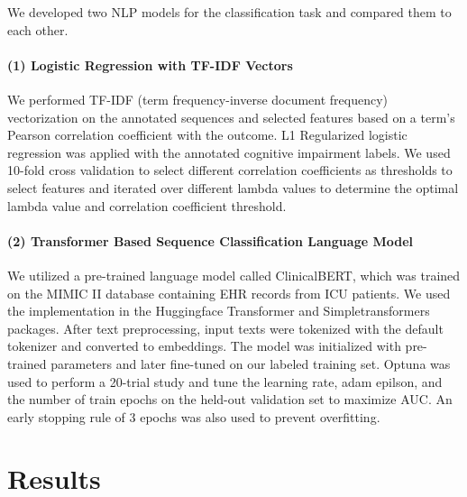 \documentclass[pmlr,twocolumn,10pt]{jmlr} %
\begin{document}
We developed two NLP models for the classification task and compared them to each other.

\label{sec:TFIDF}  
\paragraph{(1) Logistic Regression with TF-IDF Vectors} We performed TF-IDF (term frequency-inverse document frequency) vectorization on the annotated sequences and selected features based on a term's Pearson correlation coefficient with the outcome. L1 Regularized logistic regression was applied with the annotated cognitive impairment labels. We used 10-fold cross validation to select different correlation coefficients as thresholds to select features and iterated over different lambda values to determine the optimal lambda value and correlation coefficient threshold. 


\label{sec:Transformer}  
\paragraph{(2) Transformer Based Sequence Classification Language Model} We utilized a pre-trained language model called ClinicalBERT, which was trained on the MIMIC II database containing EHR records from ICU patients. We used the implementation in the Huggingface Transformer and Simpletransformers packages. After text preprocessing, input texts were tokenized with the default tokenizer and converted to embeddings. The model was initialized with pre-trained parameters and later fine-tuned on our labeled training set. Optuna was used to perform a 20-trial study and tune the learning rate, adam epilson, and the number of train epochs on the held-out validation set to maximize AUC. An early stopping rule of 3 epochs was also used to prevent overfitting. 

\section{Results}
\label{sec:Results}  

\end{document}
